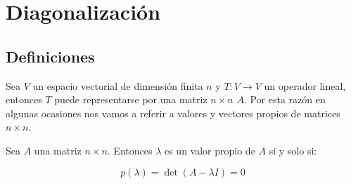 \newpage
\section{Diagonalización}

	\subsection{Definiciones}

		\begin{definicion}
			Sea $V$ un espacio vectorial de dimensión finita $n$ y $T \colon V \to V$ un operador lineal, entonces $T$ puede representarse por una matriz $n \times n$ $A$.
			Por esta razón en algunas ocasiones nos vamos a referir a valores y vectores propios de matrices $n \times n$.
		\end{definicion}

		\begin{teorema}
			Sea $A$ una matriz $n \times n$. Entonces $\lambda$ es un valor propio de $A$ si y solo si:

			\begin{equation}
				p(\lambda) = \det{(A - \lambda I)} = 0
			\end{equation}
		\end{teorema}

